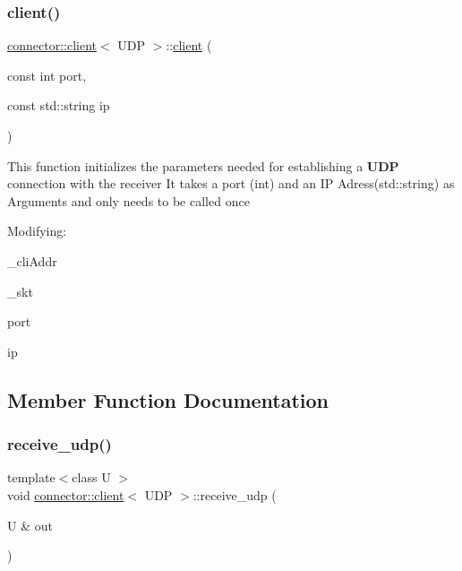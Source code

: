 \subsubsection{\texorpdfstring{client()}{client()}}
{\footnotesize\ttfamily \hyperlink{classconnector_1_1client}{connector\+::client}$<$ U\+DP $>$\+::\hyperlink{classconnector_1_1client}{client} (\begin{DoxyParamCaption}\item[{const int}]{port,  }\item[{const std\+::string}]{ip }\end{DoxyParamCaption})\hspace{0.3cm}{\ttfamily [inline]}}

This function initializes the parameters needed for establishing a {\bfseries U\+DP} connection with the receiver It takes a port ({\ttfamily int}) and an IP Adress({\ttfamily std\+::string}) as Arguments and only needs to be called once

Modifying\+:
\begin{DoxyItemize}
\item {\ttfamily \+\_\+cli\+Addr}
\item {\ttfamily \+\_\+skt}
\item {\ttfamily port}
\item {\ttfamily ip} 
\end{DoxyItemize}

\subsection{Member Function Documentation}
\mbox{\label{classconnector_1_1client_3_01UDP_01_4_ae6904da6d74dd64ba63fd0a14445bd01}} 
\subsubsection{\texorpdfstring{receive\+\_\+udp()}{receive\_udp()}\hspace{0.1cm}{\footnotesize\ttfamily [1/2]}}
{\footnotesize\ttfamily template$<$class U $>$ \\
void \hyperlink{classconnector_1_1client}{connector\+::client}$<$ U\+DP $>$\+::receive\+\_\+udp (\begin{DoxyParamCaption}\item[{U \&}]{out }\end{DoxyParamCaption})\hspace{0.3cm}{\ttfamily [inline]}}

